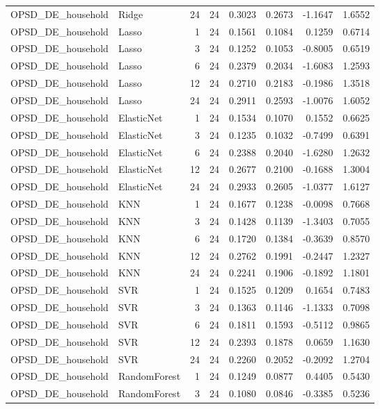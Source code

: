 \begin{tabular}{llrrrrrr}
OPSD_DE_household & Ridge & 24 & 24 & 0.3023 & 0.2673 & -1.1647 & 1.6552 \\
OPSD_DE_household & Lasso & 1 & 24 & 0.1561 & 0.1084 & 0.1259 & 0.6714 \\
OPSD_DE_household & Lasso & 3 & 24 & 0.1252 & 0.1053 & -0.8005 & 0.6519 \\
OPSD_DE_household & Lasso & 6 & 24 & 0.2379 & 0.2034 & -1.6083 & 1.2593 \\
OPSD_DE_household & Lasso & 12 & 24 & 0.2710 & 0.2183 & -0.1986 & 1.3518 \\
OPSD_DE_household & Lasso & 24 & 24 & 0.2911 & 0.2593 & -1.0076 & 1.6052 \\
OPSD_DE_household & ElasticNet & 1 & 24 & 0.1534 & 0.1070 & 0.1552 & 0.6625 \\
OPSD_DE_household & ElasticNet & 3 & 24 & 0.1235 & 0.1032 & -0.7499 & 0.6391 \\
OPSD_DE_household & ElasticNet & 6 & 24 & 0.2388 & 0.2040 & -1.6280 & 1.2632 \\
OPSD_DE_household & ElasticNet & 12 & 24 & 0.2677 & 0.2100 & -0.1688 & 1.3004 \\
OPSD_DE_household & ElasticNet & 24 & 24 & 0.2933 & 0.2605 & -1.0377 & 1.6127 \\
OPSD_DE_household & KNN & 1 & 24 & 0.1677 & 0.1238 & -0.0098 & 0.7668 \\
OPSD_DE_household & KNN & 3 & 24 & 0.1428 & 0.1139 & -1.3403 & 0.7055 \\
OPSD_DE_household & KNN & 6 & 24 & 0.1720 & 0.1384 & -0.3639 & 0.8570 \\
OPSD_DE_household & KNN & 12 & 24 & 0.2762 & 0.1991 & -0.2447 & 1.2327 \\
OPSD_DE_household & KNN & 24 & 24 & 0.2241 & 0.1906 & -0.1892 & 1.1801 \\
OPSD_DE_household & SVR & 1 & 24 & 0.1525 & 0.1209 & 0.1654 & 0.7483 \\
OPSD_DE_household & SVR & 3 & 24 & 0.1363 & 0.1146 & -1.1333 & 0.7098 \\
OPSD_DE_household & SVR & 6 & 24 & 0.1811 & 0.1593 & -0.5112 & 0.9865 \\
OPSD_DE_household & SVR & 12 & 24 & 0.2393 & 0.1878 & 0.0659 & 1.1630 \\
OPSD_DE_household & SVR & 24 & 24 & 0.2260 & 0.2052 & -0.2092 & 1.2704 \\
OPSD_DE_household & RandomForest & 1 & 24 & 0.1249 & 0.0877 & 0.4405 & 0.5430 \\
OPSD_DE_household & RandomForest & 3 & 24 & 0.1080 & 0.0846 & -0.3385 & 0.5236 \\

\end{tabular}
